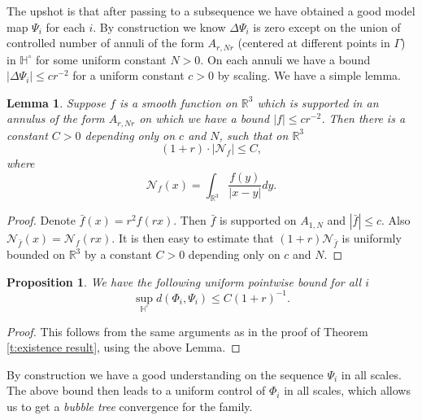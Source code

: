 \documentclass[a4paper,11pt]{amsart}
\newtheorem{lemma}[theorem]{Lemma}
\newtheorem{proposition}[theorem]{Proposition}
\theoremstyle{definition}
\numberwithin{equation}{section}
\newcommand{\dH}{\mathbb{H}}
\newcommand{\R}{\mathbb{R}}
\begin{document}
The upshot is that after passing to a subsequence we have obtained a good model map $\Psi_i$ for each $i$. By construction we know  $\Delta\Psi_i$ is zero except on the union of controlled number of annuli of the form $A_{r, Nr}$ (centered at different points in $\Gamma$) in $\dH^\circ$ for some uniform constant $N>0$. On each annuli we have a bound $|\Delta \Psi_i|\leq cr^{-2}$ for a uniform constant $c>0$ by scaling. We have a simple lemma.
 
 


 \begin{lemma}
 	Suppose $f$ is a smooth function on $\R^3$ which is supported in an annulus of the form $A_{r,  Nr}$  on which we have a bound $|f|\leq cr^{-2}$. Then there is a constant $C>0$ depending only on $c$ and $N$, such that on $\R^3$
 	$$(1+r)\cdot |\mathcal N_f|\leq C, $$
    where  $$
 	\mathcal N_f(x)=\int_{\R^3}\frac{f(y)}{|x-y|}dy.$$
 	 \end{lemma}
 \begin{proof}
 	Denote $\bar f(x)=r^2f(rx)$. Then $\bar f$ is supported on $A_{1, N}$ and $|\bar f|\leq c$. Also $\mathcal N_{\bar f}(x)=\mathcal N_f(rx)$.  It is then easy to estimate that $(1+r)\mathcal N_{\bar f}$ is uniformly bounded on $\R^3$ by a constant $C>0$ depending only on $c$ and $N$. \end{proof}



\begin{proposition}\label{t:bounded distance to model map}
   We have the following uniform pointwise bound for all $i$
\begin{equation}\label{e:uniform bound}\sup_{\dH^\circ} d(\Phi_i, \Psi_i)\leq C(1+r)^{-1}.	
\end{equation}
\end{proposition}

\begin{proof}
    This follows from the same arguments as in the proof of Theorem \ref{t:existence result}, using the above Lemma. 
\end{proof}


By construction we have a good understanding on the sequence $\Psi_i$ in all scales. The above  bound then leads to a uniform control of $\Phi_i$ in all scales, which allows us to get a \emph{bubble tree} convergence for the family. 
\end{document}
